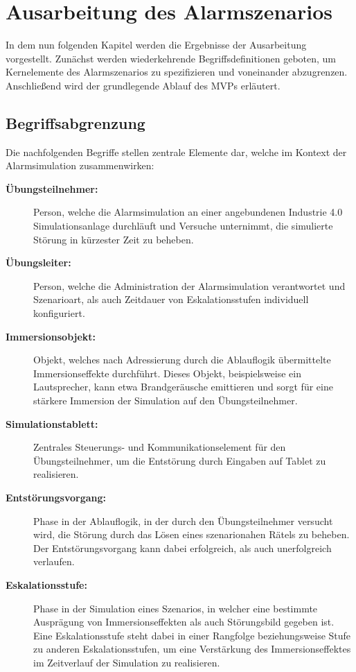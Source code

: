 \section{Ausarbeitung des Alarmszenarios}

In dem nun folgenden Kapitel werden die Ergebnisse der Ausarbeitung vorgestellt. Zunächst werden wiederkehrende Begriffsdefinitionen geboten, um Kernelemente des Alarmszenarios zu spezifizieren und voneinander abzugrenzen. Anschließend wird der grundlegende Ablauf des MVPs erläutert.

\subsection{Begriffsabgrenzung}

Die nachfolgenden Begriffe stellen zentrale Elemente dar, welche im Kontext der Alarmsimulation zusammenwirken:

\begin{description}
    \item [\textbf{Übungsteilnehmer:}] 
     Person, welche die Alarmsimulation an einer angebundenen Industrie 4.0 Simulationsanlage durchläuft und Versuche unternimmt, die simulierte Störung in kürzester Zeit zu beheben. 

     \item [\textbf{Übungsleiter:}] 
    Person, welche die Administration der Alarmsimulation verantwortet und Szenarioart, als auch Zeitdauer von Eskalationsstufen individuell konfiguriert.

    \item [\textbf{Immersionsobjekt:}] 
   Objekt, welches nach Adressierung durch die Ablauflogik übermittelte Immersionseffekte durchführt. Dieses Objekt, beispielsweise ein Lautsprecher, kann etwa Brandgeräusche emittieren und sorgt für eine stärkere Immersion der Simulation auf den Übungsteilnehmer.

   \item [\textbf{Simulationstablett:}] 
   Zentrales Steuerungs- und Kommunikationselement für den Übungsteilnehmer, um die Entstörung durch Eingaben auf Tablet zu realisieren.

    \item [\textbf{Entstörungsvorgang:}] 
    Phase in der Ablauflogik, in der durch den Übungsteilnehmer versucht wird, die Störung durch das Lösen eines szenarionahen Rätels zu beheben. Der Entstörungsvorgang kann dabei erfolgreich, als auch unerfolgreich verlaufen.
   
   \item [\textbf{Eskalationsstufe:}] 
   Phase in der Simulation eines Szenarios, in welcher eine bestimmte Ausprägung von Immersionseffekten als auch Störungsbild gegeben ist. Eine Eskalationsstufe steht dabei in einer Rangfolge beziehungsweise Stufe zu anderen Eskalationsstufen, um eine Verstärkung des Immersionseffektes im Zeitverlauf der Simulation zu realisieren.
\end{description}


